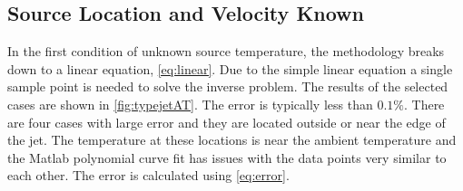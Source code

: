 \documentclass[preprint,12pt]{elsarticle}
\begin{document}
\subsection{Source Location and Velocity Known}
In the first condition of unknown source temperature, the methodology breaks down to a linear equation, \cref{eq:linear}.  Due to the simple linear equation a single sample point is needed to solve the inverse problem.  The results of the selected cases are shown in \cref{fig:typejetAT}.  The error is typically less than $0.1\%$.  There are four cases with large error and they are located outside or near the edge of the jet.  The temperature at these locations is near the ambient temperature and the Matlab polynomial curve fit has issues with the data points very similar to each other.  The error is calculated using \cref{eq:error}.



\end{document}
